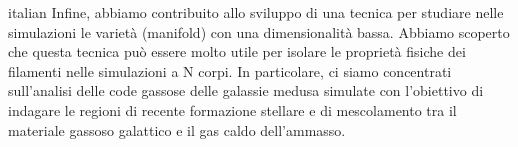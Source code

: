 \begin{otherlanguage*}{italian}
Infine, abbiamo contribuito allo sviluppo di una tecnica per studiare nelle simulazioni le varietà (manifold) con una dimensionalità bassa.
Abbiamo scoperto che questa tecnica può essere molto utile per isolare le proprietà fisiche dei filamenti nelle simulazioni a N corpi.
In particolare, ci siamo concentrati sull'analisi delle code gassose delle galassie medusa simulate con l'obiettivo di indagare le regioni di recente formazione stellare e di mescolamento tra il materiale gassoso galattico e il gas caldo dell'ammasso.
\end{otherlanguage*}